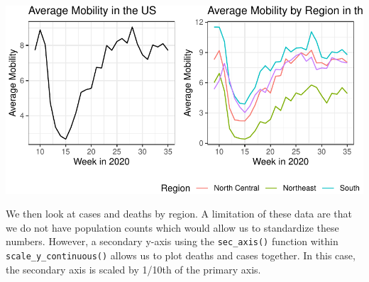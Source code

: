 \documentclass[
  letterpaper,
]{latex/krantz}
\begin{document}
\begin{center}
\includegraphics[width=1\textwidth,height=\textheight]{book/cs_eda_files/figure-pdf/unnamed-chunk-13-1.pdf}
\end{center}

We then look at cases and deaths by region. A limitation of these data
are that we do not have population counts which would allow us to
standardize these numbers. However, a secondary y-axis using the
\texttt{sec\_axis()}
function within \texttt{scale\_y\_continuous()} allows us to plot deaths
and cases together. In this case, the secondary
axis is scaled by 1/10th of the primary axis.
\end{document}
